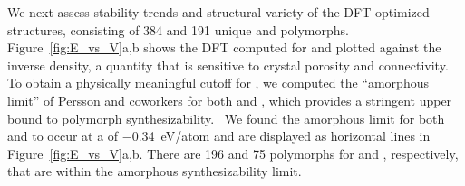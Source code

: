 %
%
We next assess stability trends and structural variety of the DFT optimized structures, consisting of \num{384} and \num{191} unique \IrOtwo and \IrOthree polymorphs.
%
Figure~\ref{fig:E_vs_V}a,b shows the DFT computed \DHf for \IrOtwo and \IrOthree plotted against the inverse density,
a quantity that is sensitive to crystal porosity and connectivity.
%
To obtain a physically meaningful cutoff for \DHf, we computed the ``amorphous limit'' of Persson and coworkers for both \IrOtwo and \IrOthree,
which provides a stringent upper bound to polymorph synthesizability.~\cite{Aykol2018}
%
We found the amorphous limit for both \IrOtwo and \IrOthree to occur at a \DHf of \SI{-0.34}{\electronvolt}/atom and are displayed as horizontal lines in Figure~\ref{fig:E_vs_V}a,b.
%
There are \num{196} and \num{75} polymorphs for \IrOtwo and \IrOthree, respectively, that are within the amorphous synthesizability limit.


